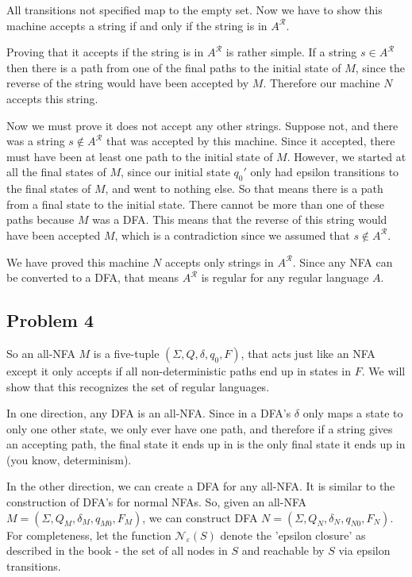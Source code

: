 \documentclass[english]{article}
\begin{document}
All transitions not specified map to the empty set. Now we have to show this machine accepts a string if and only if the string is in $A^\mathcal{R}$.

Proving that it accepts if the string is in $A^\mathcal{R}$ is rather simple. If a string $s \in A^\mathcal{R}$ then there is a path from one of the final paths to the initial state of $M$, since the reverse of the string would have been accepted by $M$. Therefore our machine $N$ accepts this string.

Now we must prove it does not accept any other strings. Suppose not, and there was a string $s \notin A^\mathcal{R}$ that was accepted by this machine. Since it accepted, there must have been at least one path to the initial state of $M$. However, we started at all the final states of $M$, since our initial state $q_0'$ only had epsilon transitions to the final states of $M$, and went to nothing else. So that means there is a path from a final state to the initial state. There cannot be more than one of these paths because $M$ was a DFA. This means that the reverse of this string would have been accepted $M$, which is a contradiction since we assumed that $s \notin A^\mathcal{R}$.

We have proved this machine $N$ accepts only strings in $A^\mathcal{R}$. Since any NFA can be converted to a DFA, that means $A^\mathcal{R}$ is regular for any regular language $A$.

\subsection*{Problem 4}
So an all-NFA $M$ is a five-tuple $(\Sigma,Q,\delta,q_0,F)$, that acts just like an NFA except it only accepts if all non-deterministic paths end up in states in $F$. We will show that this recognizes the set of regular languages.

In one direction, any DFA is an all-NFA. Since in a DFA's $\delta$ only maps a state to only one other state, we only ever have one path, and therefore if a string gives an accepting path, the final state it ends up in is the only final state it ends up in (you know, determinism).

In the other direction, we can create a DFA for any all-NFA. It is similar to the construction of DFA's for normal NFAs. So, given an all-NFA $M = (\Sigma,Q_M,\delta_M,q_{M0},F_M)$, we can construct DFA $N = (\Sigma,Q_N,\delta_N,q_{N0},F_N)$. For completeness, let the function $\mathcal{N}_\varepsilon(S)$ denote the 'epsilon closure' as described in the book - the set of all nodes in $S$ and reachable by $S$ via epsilon transitions.
\end{document}
